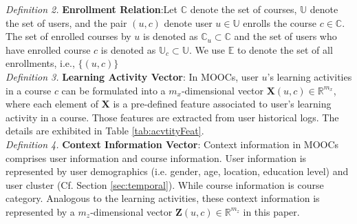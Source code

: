 \emph{Definition 2.} \textbf{Enrollment Relation}:Let $\mathbb{C}$ denote the set of courses, $\mathbb{U}$ denote the set of users, and the pair $(u,c)$ denote user $u\in \mathbb{U}$ enrolls the course $c\in \mathbb{C}$.
The set of enrolled courses by $u$ is denoted as  $\mathbb{C}_u\subset \mathbb{C}$ and 
the set of users who have enrolled course $c$ is denoted as $\mathbb{U}_c\subset \mathbb{U}$.
We use $\mathbb{E}$ to denote the set of all enrollments, i.e., $\{(u,c)\}$\\


\emph{Definition 3.} \textbf{Learning Activity Vector}: 
In MOOCs, user $u$'s learning activities in a course $c$ can be formulated into a $m_x$-dimensional vector $\mathbf{X}(u,c) \in \mathbb{R}^{m_x}$, where each element of $\mathbf{X}$ is a pre-defined feature associated to user's learning activity in a course. Those features are extracted from user historical logs. The details are exhibited in Table \ref{tab:acvtityFeat}. \\

\emph{Definition 4.} \textbf{Context Information Vector}: Context information in MOOCs comprises user information and course information. User information is represented by user demographics (i.e. gender, age, location, education level) and user cluster (Cf. Section \ref{sec:temporal}). While course information is course category. Analogous to the learning activities, these context information is represented by a $m_z
$-dimensional vector $\mathbf{Z}(u,c) \in \mathbb{R}^{m_z}$ in this paper.  \\




